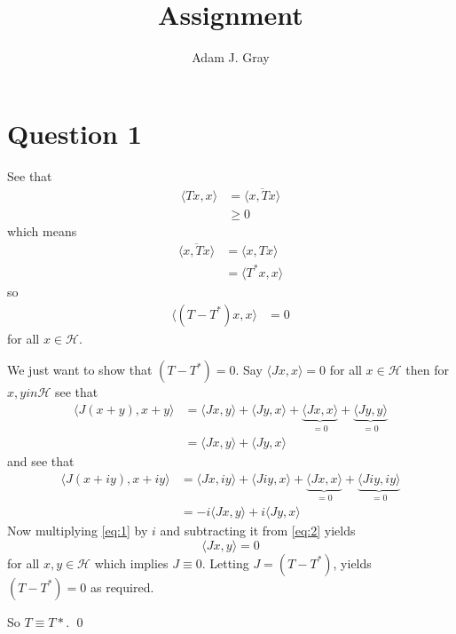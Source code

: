 \documentclass{unswmaths}
\begin{document}
\author{Adam J. Gray}
\title{Assignment}
\subject{Functional Analysis}

\unswtitle
\unswantiplagdec
\section*{Question 1}
See that
\begin{align*}
	\langle Tx, x \rangle &= \overline{\langle x, Tx \rangle} \\
		&\geq 0
\end{align*}
which means
\begin{align*}
	\overline{\langle x, Tx \rangle} &= \langle x, Tx \rangle \\
	    &= \langle T^* x, x \rangle
\end{align*}
so
\begin{align*}
	\langle (T - T^*)x, x \rangle &= 0
\end{align*}
for all $ x \in \mathcal{H} $.

We just want to show that $ (T - T^*) = 0 $. 
Say $ \langle Jx, x \rangle  = 0 $ for all $ x \in \mathcal{H} $ 
then for $ x, y in \mathcal{H} $ see that 
\begin{align}
    \langle J(x + y), x + y \rangle &= \langle Jx, y \rangle 
        + \langle Jy, x \rangle + \underbrace{\langle Jx, x \rangle}_{=0}
        + \underbrace{\langle Jy, y \rangle}_{=0} \nonumber \\
        \label{eq:1}
        &= \langle Jx, y \rangle + \langle Jy, x \rangle
\end{align}
and see that
\begin{align} 
    \langle J(x + iy), x + iy \rangle &= \langle Jx, iy \rangle 
        + \langle Jiy, x \rangle + \underbrace{\langle Jx, x \rangle}_{=0}
        + \underbrace{\langle Jiy, iy \rangle}_{=0} \nonumber \\
        &= -i\langle Jx, y \rangle + i\langle Jy, x \rangle  
        \label{eq:2}
\end{align}
Now multiplying \eqref{eq:1} by $ i $ and subtracting it from \eqref{eq:2} yields
$$
    \langle Jx, y \rangle = 0
$$
for all $ x, y \in \mathcal{H} $ which implies $ J \equiv 0 $.
Letting $ J = (T - T^*) $, yields $ (T - T^*) = 0 $ as required.

So $ T \equiv T* $. \qed
\end{document}
